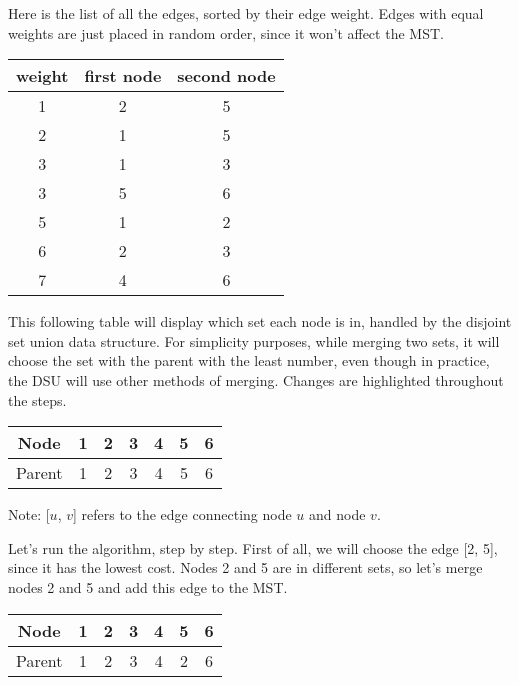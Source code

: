 \documentclass{article}
\begin{document}
 Here is the list of all the edges, sorted by their edge weight. Edges with equal weights are just placed in random order, since it won't affect the MST.
 
 \begin{center}
 \begin{tabular}{ |c|c|c|}
 \hline
 weight & first node & second node \\
 \hline
 1 & 2 & 5 \\
 \hline
 2 & 1 & 5 \\
  \hline
 3 & 1 & 3 \\
  \hline
 3 & 5 & 6 \\
  \hline
 5 & 1 & 2 \\
  \hline
 6 & 2 & 3 \\
  \hline
 7 & 4 & 6 \\
 \hline 
 \end{tabular}
 \end{center}
 
This following table will display which set each node is in, handled by the disjoint set union data structure. For simplicity purposes, while merging two sets, it will choose the set with the parent with the least number, even though in practice, the DSU will use other methods of merging. Changes are highlighted throughout the steps.

\begin{center}
\begin{tabular}{|c|c|c|c|c|c|c|}
\hline
Node & 1 & 2 & 3 & 4 & 5 & 6\\
\hline
Parent & 1 & 2 & 3 & 4 & 5 & 6 \\
\hline
\end{tabular}
\end{center}
 
\noindent Note: [$u$, $v$] refers to the edge connecting node $u$ and node $v$.
 
 
Let's run the algorithm, step by step. First of all, we will choose the edge [2, 5], since it has the lowest cost. Nodes 2 and 5 are in different sets, so let's merge nodes 2 and 5 and add this edge to the MST.

\begin{center}
\begin{tabular}{|c|c|c|c|c|c|c|}
\hline
Node & 1 & 2 & 3 & 4 & \cellcolor[gray]{0.75}5 & 6\\
\hline
Parent & 1 & 2 & 3 & 4 & \cellcolor[gray]{0.75}2 & 6 \\
\hline
\end{tabular}
\end{center}
\end{document}
